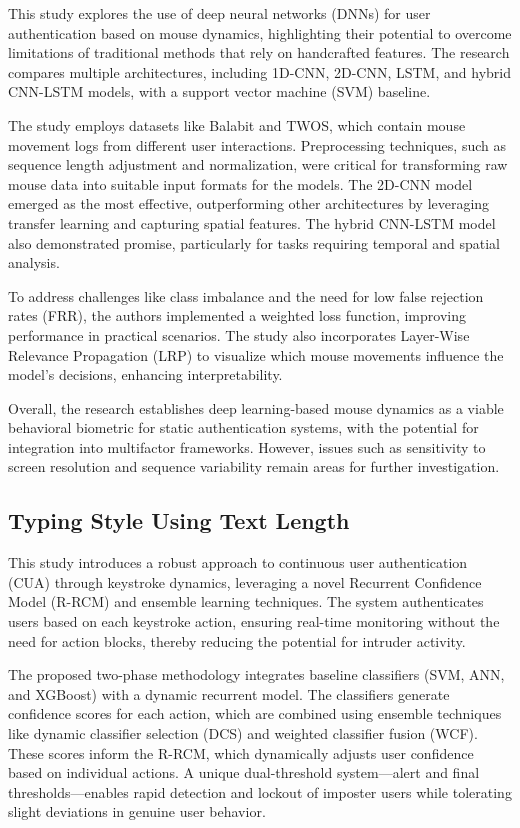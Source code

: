 \parencite{20_Mouse_Coordinate} This study explores the use of deep neural networks (DNNs) for user authentication based on mouse dynamics, highlighting their potential to overcome limitations of traditional methods that rely on handcrafted features. The research compares multiple architectures, including 1D-CNN, 2D-CNN, LSTM, and hybrid CNN-LSTM models, with a support vector machine (SVM) baseline.

The study employs datasets like Balabit and TWOS, which contain mouse movement logs from different user interactions. Preprocessing techniques, such as sequence length adjustment and normalization, were critical for transforming raw mouse data into suitable input formats for the models. The 2D-CNN model emerged as the most effective, outperforming other architectures by leveraging transfer learning and capturing spatial features. The hybrid CNN-LSTM model also demonstrated promise, particularly for tasks requiring temporal and spatial analysis.

To address challenges like class imbalance and the need for low false rejection rates (FRR), the authors implemented a weighted loss function, improving performance in practical scenarios. The study also incorporates Layer-Wise Relevance Propagation (LRP) to visualize which mouse movements influence the model's decisions, enhancing interpretability.

Overall, the research establishes deep learning-based mouse dynamics as a viable behavioral biometric for static authentication systems, with the potential for integration into multifactor frameworks. However, issues such as sensitivity to screen resolution and sequence variability remain areas for further investigation.

\subsection{Typing Style Using Text Length}

\parencite{30_Typing_Textlength} This study introduces a robust approach to continuous user authentication (CUA) through keystroke dynamics, leveraging a novel Recurrent Confidence Model (R-RCM) and ensemble learning techniques. The system authenticates users based on each keystroke action, ensuring real-time monitoring without the need for action blocks, thereby reducing the potential for intruder activity.

The proposed two-phase methodology integrates baseline classifiers (SVM, ANN, and XGBoost) with a dynamic recurrent model. The classifiers generate confidence scores for each action, which are combined using ensemble techniques like dynamic classifier selection (DCS) and weighted classifier fusion (WCF). These scores inform the R-RCM, which dynamically adjusts user confidence based on individual actions. A unique dual-threshold system—alert and final thresholds—enables rapid detection and lockout of imposter users while tolerating slight deviations in genuine user behavior.

